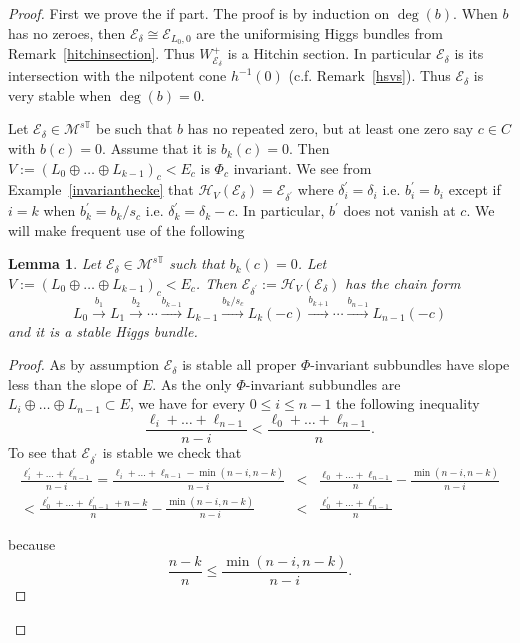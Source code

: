 \documentclass[12pt]{article}
\numberwithin{equation}{section}
\newtheorem{lemma}[theorem]{Lemma}
\theoremstyle{remark}
\theoremstyle{definition}
\numberwithin{theorem}{section}
\def\bes{\begin{eqnarray*}}
\def\ees{\end{eqnarray*}}
\def\calE{{\mathcal E}}
\def\M{{\mathcal{M}}}
\def\calH{\mathcal{H}}
\newcommand{\T}{{\mathbb{T}}}
\def\d{{{\delta}}}
\renewcommand{\1}{\mathbbm{1}}
\begin{document}
\begin{proof} First we prove the if part. The proof is by induction on $\deg(b)$. When $b$ has no zeroes, then $\calE_{\d}\cong \calE_{L_0,0}$ are the uniformising Higgs bundles from Remark~\ref{hitchinsection}. Thus $W^+_{\calE_{\d}}$ is a Hitchin section. In particular $\calE_{\d}$ is its intersection with the nilpotent cone $h^{-1}(0)$ (c.f. Remark~\ref{hsvs}). Thus $\calE_{\d}$ is very stable when $\deg(b)=0$. 
	
	Let $\calE_{\d} \in \M^{s\T}$ be such that $b$ has no repeated zero, but at least one zero say $c\in C$ with $b(c)=0$. Assume that it is $b_k(c)=0$. Then $V:=(L_0\oplus \dots \oplus L_{k-1})_c<E_c$ is $\Phi_c$ invariant. We see from Example~\ref{invarianthecke} that $\calH_{V}(\calE_{\d})=\calE_{\d^\prime}$ where $\d^\prime_i=\d_i$ i.e. $b^\prime_i=b_i$ except if  $i=k$ when  $b^\prime_k=b_k/s_c$ i.e. $\d^\prime_k=\d_k-c$. In particular, $b^\prime$ does not vanish at $c$. We will make frequent use of the following
	\begin{lemma}\label{stablemma} Let $\calE_{\d} \in \M^{s\T}$ such that $b_k(c)=0$. Let $V:=(L_0\oplus \dots \oplus L_{k-1})_c<E_c$. Then  $\calE_{\d^\prime}:=\calH_{V}(\calE_{\d})$ has the chain form
$$L_0\stackrel{b_1}{\rightarrow}{L_1}\stackrel{b_2}{\rightarrow}\cdots \stackrel{b_{k-1}}{\rightarrow}L_{k-1} \stackrel{b_k/s_c}{\rightarrow} L_k(-c)\stackrel{b_{k+1}}{\rightarrow}\cdots \stackrel{b_{n-1}}{\rightarrow}{L_{n-1}(-c)}$$ and it is a stable Higgs bundle.
	\end{lemma}
	\begin{proof} As by assumption $\calE_{\d}$ is stable all proper $\Phi$-invariant subbundles have slope less than the slope of $E$. As the  only $\Phi$-invariant subbundles are $L_i\oplus \dots \oplus L_{n-1}\subset E$, we have for every $0\leq i \leq n-1$ the following inequality  $$\frac{\ell_i+\dots+\ell_{n-1}}{n-i}<\frac{\ell_0+\dots+\ell_{n-1}}{n}.$$ To see that $\calE_{\d^\prime}$ is stable we check that \bes \frac{\ell^\prime_i+\dots+\ell^\prime_{n-1}}{n-i}=\frac{\ell_i+\dots+\ell_{n-1}-\min(n-i,n-k)}{n-i}&<&\frac{\ell_0+\dots+\ell_{n-1}}{n}-\frac{\min(n-i,n-k)}{n-i}\\
		< \frac{\ell^\prime_0+\dots+\ell^\prime_{n-1}+n-k}{n}-\frac{\min(n-i,n-k)}{n-i}	
		&<& \frac{\ell^\prime_0+\dots+\ell^\prime_{n-1}}{n} \ees 
		
		because $$\frac{n-k}{n}\leq \frac{\min(n-i,n-k)}{n-i}.$$
	\end{proof}
	

\end{proof}
\end{document}
